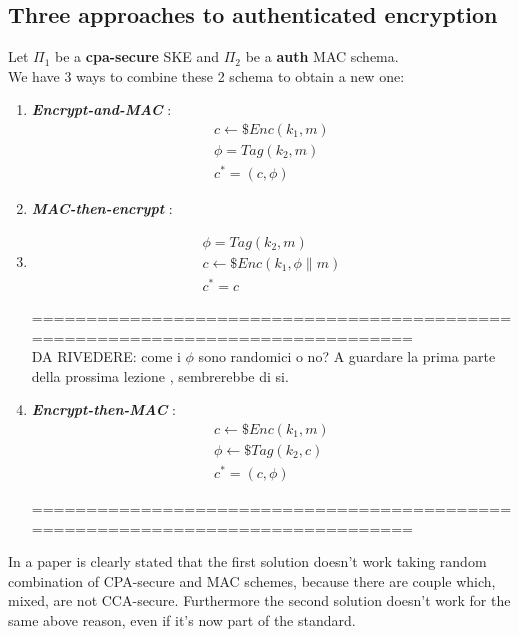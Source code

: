 \subsection{Three approaches to authenticated encryption}
Let $\Pi_{1}$ be a \textbf{cpa-secure} SKE and $\Pi_{2}$ be a \textbf{auth} MAC
schema.\\
We have 3 ways to combine these 2 schema to obtain a new one:
\begin{enumerate}
    \item \textbf{ \textit{Encrypt-and-MAC} } :
        \begin{gather*}
            c \leftarrow\$ Enc(k_{1}, m)\\
            \phi = Tag(k_{2}, m)\\
            c^{*}=(c, \phi)
        \end{gather*}
        
    \item  \textbf{ \textit{MAC-then-encrypt} } :
    \item 
        \begin{gather*}
            \phi = Tag(k_{2}, m)\\
            c \leftarrow\$ Enc(k_{1}, \phi \| m)\\
            c^{*}=c
        \end{gather*}

===============================================================================\\
DA RIVEDERE: come i $\phi$ sono randomici o no? A guardare la prima parte della
prossima lezione , sembrerebbe di si.\\
    \item  \textbf{ \textit{Encrypt-then-MAC} } :
        \begin{gather*}
            c \leftarrow\$ Enc(k_{1}, m)\\
            \phi \leftarrow\$ Tag(k_{2}, c) \\
            c^{*}=(c, \phi)
        \end{gather*}
        
===============================================================================\\
\end{enumerate}

In a paper is clearly stated that the first solution doesn't work taking random combination of CPA-secure and MAC schemes, because there are couple which, mixed, are not CCA-secure. Furthermore the second solution doesn't work for the same above reason, even if it's now part of the standard.

